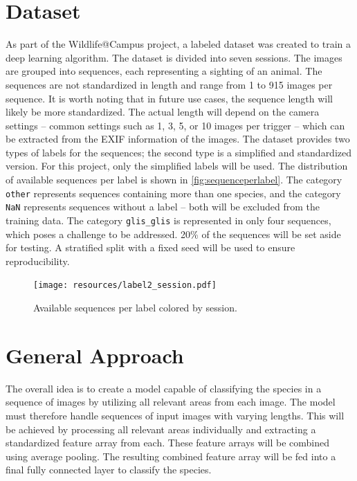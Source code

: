 \documentclass{article}
\begin{document}
\section*{Dataset} %

As part of the Wildlife@Campus project, a labeled dataset was created to train a deep learning algorithm.
The dataset is divided into seven sessions. The images are grouped into sequences, each representing a sighting
of an animal. The sequences are not standardized in length and range from 1 to 915 images per sequence.
It is worth noting that in future use cases, the sequence length will likely be more standardized.
The actual length will depend on the camera settings -- common settings such as 1, 3, 5, or 10 images per trigger --
which can be extracted from the EXIF information of the images. The dataset provides two types of labels for the 
sequences; the second type is a simplified and standardized version. For this project, only the simplified labels
will be used. The distribution of available sequences per label is shown in \autoref{fig:sequenceperlabel}.
The category \texttt{other} represents sequences containing more than one species, and the category \texttt{NaN}
represents sequences without a label -- both will be excluded from the training data.
The category \texttt{glis\_glis} is represented in only four sequences, which poses a challenge to be addressed.
20\% of the sequences will be set aside for testing. A stratified split with a fixed seed will be used to ensure
reproducibility.

\begin{figure}[ht]
  \centering
  \texttt{[image: resources/label2\_session.pdf]}
  \caption{Available sequences per label colored by session.}
  \label{fig:sequenceperlabel}
\end{figure}

\section*{General Approach} %

The overall idea is to create a model capable of classifying the species in a sequence of images by utilizing all 
relevant areas from each image. The model must therefore handle sequences of input images with varying lengths.
This will be achieved by processing all relevant areas individually and extracting a standardized feature array from 
each. These feature arrays will be combined using average pooling. The resulting combined feature array
will be fed into a final fully connected layer to classify the species.
\end{document}
